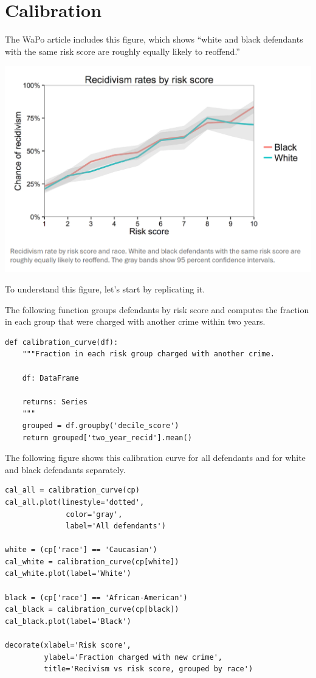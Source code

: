 \hypertarget{calibration-1}{%
\section{Calibration}\label{calibration-1}}

The WaPo article includes this figure, which shows ``white and black
defendants with the same risk score are roughly equally likely to
reoffend.''

\includegraphics{figs/calibration1.png}

To understand this figure, let's start by replicating it.

The following function groups defendants by risk score and computes the
fraction in each group that were charged with another crime within two
years.

\begin{lstlisting}[]
def calibration_curve(df):
    """Fraction in each risk group charged with another crime.
    
    df: DataFrame
    
    returns: Series
    """
    grouped = df.groupby('decile_score')
    return grouped['two_year_recid'].mean()
\end{lstlisting}

The following figure shows this calibration curve for all defendants and
for white and black defendants separately.

\begin{lstlisting}[]
cal_all = calibration_curve(cp)
cal_all.plot(linestyle='dotted', 
              color='gray',
              label='All defendants')

white = (cp['race'] == 'Caucasian')
cal_white = calibration_curve(cp[white])
cal_white.plot(label='White')

black = (cp['race'] == 'African-American')
cal_black = calibration_curve(cp[black])
cal_black.plot(label='Black')

decorate(xlabel='Risk score',
         ylabel='Fraction charged with new crime',
         title='Recivism vs risk score, grouped by race')
\end{lstlisting}

